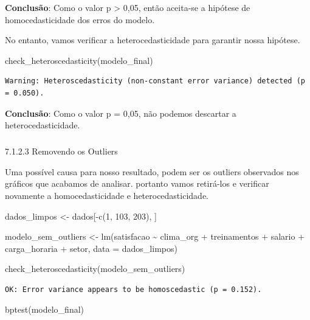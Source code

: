 \documentclass[
  letterpaper,
  DIV=11,
  numbers=noendperiod]{scrartcl}
\makeatletter
\let\oldsubparagraph\subparagraph
\renewcommand{\subparagraph}{
    \@ifstar
      \xxxSubParagraphStar
      \xxxSubParagraphNoStar
  }
\newcommand{\xxxSubParagraphStar}[1]{\oldsubparagraph*{#1}\mbox{}}
\newcommand{\xxxSubParagraphNoStar}[1]{\oldsubparagraph{#1}\mbox{}}
\newenvironment{Shaded}{\begin{snugshade}}{\end{snugshade}}
\newcommand{\AttributeTok}[1]{\textcolor[rgb]{0.40,0.45,0.13}{#1}}
\newcommand{\DecValTok}[1]{\textcolor[rgb]{0.68,0.00,0.00}{#1}}
\newcommand{\FunctionTok}[1]{\textcolor[rgb]{0.28,0.35,0.67}{#1}}
\newcommand{\NormalTok}[1]{\textcolor[rgb]{0.00,0.23,0.31}{#1}}
\newcommand{\OtherTok}[1]{\textcolor[rgb]{0.00,0.23,0.31}{#1}}
\newcommand{\SpecialCharTok}[1]{\textcolor[rgb]{0.37,0.37,0.37}{#1}}
\makeatother
\begin{document}
\textbf{Conclusão}: Como o valor p \textgreater{} 0,05, então aceita-se
a hipótese de homocedasticidade dos erros do modelo.

No entanto, vamos verificar a heterocedasticidade para garantir nossa
hipótese.

\begin{Shaded}
\begin{Highlighting}[]
\FunctionTok{check\_heteroscedasticity}\NormalTok{(modelo\_final)}
\end{Highlighting}
\end{Shaded}

\begin{verbatim}
Warning: Heteroscedasticity (non-constant error variance) detected (p = 0.050).
\end{verbatim}

\textbf{Conclusão}: Como o valor p = 0,05, não podemos descartar a
heterocedasticidade.

\subparagraph{7.1.2.3 Removendo os
Outliers}\label{removendo-os-outliers}

Uma possível causa para nosso resultado, podem ser os outliers
observados nos gráficos que acabamos de analisar. portanto vamos
retirá-los e verificar novamente a homocedasticidade e
heterocedasticidade.

\begin{Shaded}
\begin{Highlighting}[]
\NormalTok{dados\_limpos }\OtherTok{\textless{}{-}}\NormalTok{ dados[}\SpecialCharTok{{-}}\FunctionTok{c}\NormalTok{(}\DecValTok{1}\NormalTok{, }\DecValTok{103}\NormalTok{, }\DecValTok{203}\NormalTok{), ]}

\NormalTok{modelo\_sem\_outliers }\OtherTok{\textless{}{-}} \FunctionTok{lm}\NormalTok{(satisfacao }\SpecialCharTok{\textasciitilde{}}\NormalTok{ clima\_org }\SpecialCharTok{+}\NormalTok{ treinamentos }\SpecialCharTok{+}\NormalTok{ salario }\SpecialCharTok{+}\NormalTok{ carga\_horaria }\SpecialCharTok{+}\NormalTok{ setor, }\AttributeTok{data =}\NormalTok{ dados\_limpos)}

\FunctionTok{check\_heteroscedasticity}\NormalTok{(modelo\_sem\_outliers)}
\end{Highlighting}
\end{Shaded}

\begin{verbatim}
OK: Error variance appears to be homoscedastic (p = 0.152).
\end{verbatim}

\begin{Shaded}
\begin{Highlighting}[]
\FunctionTok{bptest}\NormalTok{(modelo\_final)}
\end{Highlighting}
\end{Shaded}
\end{document}
